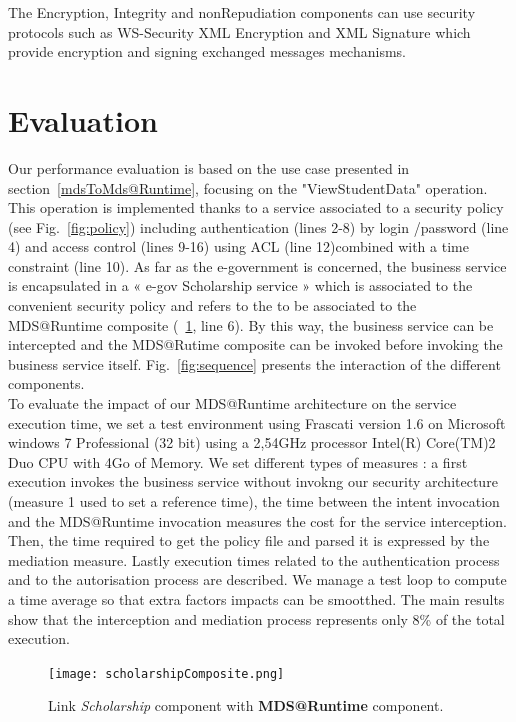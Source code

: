 \documentclass[runningheads,a4paper]{llncs}
\begin{document}
The Encryption, Integrity and nonRepudiation components can use security protocols such as WS-Security XML Encryption and XML Signature which provide encryption and signing  exchanged messages mechanisms.


\section{Evaluation}

\label{sec:evaluation}


 Our performance evaluation is based on the use case presented in section~\ref{mdsToMds@Runtime}, focusing on the "ViewStudentData" operation. This operation is implemented thanks to a service associated to a security policy (see Fig.~\ref{fig:policy}) including authentication (lines 2-8) by login /password (line 4) and access control (lines 9-16) using ACL (line 12)combined with a time constraint (line 10). As far as the e-government is concerned, the business service is encapsulated in a « e-gov Scholarship service » which is associated to the convenient security policy and refers to the to be associated to the MDS@Runtime composite (~\ref{fig:gestionEtudiant}, line 6). By this way, the business service can be intercepted and the MDS@Rutime composite can be invoked before invoking the business service itself.
Fig.~\ref{fig:sequence} presents the interaction of the different components.
\\To evaluate the impact of our MDS@Runtime architecture on the service execution time, we set a test environment using Frascati version 1.6 on Microsoft windows 7 Professional (32 bit) using a 2,54GHz processor Intel(R) Core(TM)2 Duo CPU with 4Go of Memory.
We set different types of measures : a first execution invokes the business service without invokng our security architecture (measure 1 used to set a reference time), the time between the intent invocation and the MDS@Runtime invocation measures the cost for the service interception. Then, the time required to get the policy file and parsed it is expressed by the mediation measure. Lastly execution times related to the authentication process and to the autorisation process are described.
We manage a test loop to compute a time average so that extra factors impacts can be  smootthed.
The main results show that the interception and mediation process represents only 8\% of the total execution. 

\begin{figure}  
\center
\texttt{[image: scholarshipComposite.png]}
\caption{Link \emph{Scholarship} component with \textbf{MDS@Runtime} component.}
\label{fig:gestionEtudiant}
\end{figure}
\end{document}
